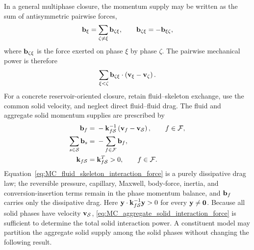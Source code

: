 In a general multiphase closure, the momentum supply may be written as the sum
of antisymmetric pairwise forces,
%
\begin{equation}
	\mathbf{b}_\xi
	=
	\sum_{\zeta\ne\xi}
	\mathbf{b}_{\zeta\xi},
	\qquad
	\mathbf{b}_{\zeta\xi}
	=
	-\mathbf{b}_{\xi\zeta},
	\label{eq:MC_pairwise_interaction_force}
\end{equation}
%
where \(\mathbf{b}_{\zeta\xi}\) is the force exerted on phase \(\xi\) by phase
\(\zeta\).  The pairwise mechanical power is therefore
%
\begin{equation}
	\sum_{\xi<\zeta}
	\mathbf{b}_{\zeta\xi}\cdot
	\left(
	\mathbf{v}_\xi-\mathbf{v}_\zeta
	\right).
	\label{eq:MC_interaction_power_pairing}
\end{equation}
%
For a concrete reservoir-oriented closure, retain fluid--skeleton exchange,
use the common solid velocity, and neglect direct fluid--fluid drag.  The
fluid and aggregate solid momentum supplies are prescribed by
%
\begin{subequations}
	\label{eq:MC_interphase_exchange_law}
	\begin{align}
		\mathbf{b}_f
		={}&
		-\mathbf{k}_{f\mathcal{S}}^{-1}
		\left(
			\mathbf{v}_f-\mathbf{v}_{\mathcal{S}}
		\right),
		\qquad
		f\in\mathcal{F},
		\label{eq:MC_fluid_skeleton_interaction_force}
		\\
		\sum_{s\in\mathcal{S}}\mathbf{b}_s
		={}&
		-\sum_{f\in\mathcal{F}}\mathbf{b}_f,
		\label{eq:MC_aggregate_solid_interaction_force}
		\\
		\mathbf{k}_{f\mathcal{S}}
		={}&
		\mathbf{k}_{f\mathcal{S}}^T>0,
		\qquad
		f\in\mathcal{F} .
		\label{eq:MC_fluid_skeleton_drag_tensor}
	\end{align}
\end{subequations}
%
Equation~\eqref{eq:MC_fluid_skeleton_interaction_force} is a purely dissipative
drag law; the reversible pressure, capillary, Maxwell, body-force, inertia,
and conversion-insertion terms remain in the phase momentum balance, and
\(\mathbf{b}_f\) carries only the dissipative drag.  Here
\(\mathbf{y}\cdot\mathbf{k}_{f\mathcal{S}}^{-1}\mathbf{y}>0\) for every
\(\mathbf{y}\ne\mathbf{0}\).  Because all solid phases have velocity
\(\mathbf{v}_{\mathcal{S}}\), \eqref{eq:MC_aggregate_solid_interaction_force} is
sufficient to determine the total solid interaction power.  A constituent
model may partition the aggregate solid supply among the solid phases without
changing the following result.


